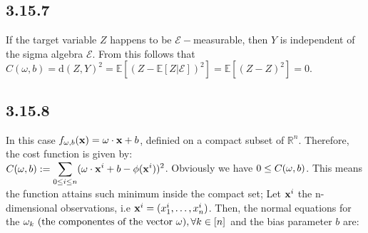 \documentclass{exam}
\begin{document}
\subsection*{3.15.7}
If the target variable $Z$ happens to be $\mathcal{E}-$measurable, then $Y$ is independent of the sigma algebra $\mathcal{E}$. From this follows that $C(\omega, b) = \text{d}(Z,Y)^2 = \mathbb{E} \left[ (Z - \mathbb{E}\left[ Z |\mathcal{E} \right] )^2\right]  = \mathbb{E} \left[ (Z - Z)^2\right] = 0$.

\subsection*{3.15.8}
In this case $ \displaystyle f_{\tiny \bold{\omega}, b}(\bold{x}) = \bold{\omega} \cdot \bold{x} + b$, definied on a compact subset of $\mathbb{R}^n$. Therefore, the cost function is given by: \\[0.25 em]
$C(\bold{\omega}, b) := \displaystyle \sum_{\tiny 0 \leq i\leq n } ( \bold{\omega} \cdot \bold{x}^{i} + b - \phi(\bold{x}^{i}))^{2}$. Obviously we have $0 \leq C(\bold{\omega}, b)$. This means the function attains such minimum inside the compact set; Let $\bold{x}^{i}$ the n-dimensional observations, i.e $\bold{x}^{i}= (x_{1}^{i}, \ldots, x_{n}^{i})$. Then, the normal equations for the $\omega_k \text{ (the componentes of the vector $\bold{\omega}$)}, \forall k \in \left[n\right]$ and 
the bias parameter $b$ are:\\
\end{document}
